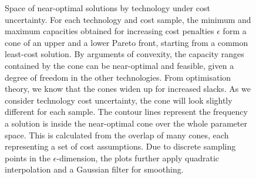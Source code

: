 \begin{figure}
    \vspace{-2cm}
    \noindent{} \noindent{} \noindent{} \caption{ Space of near-optimal solutions by technology under cost
    uncertainty. For each technology and cost sample, the minimum and maximum
    capacities obtained for increasing cost penalties $\epsilon$ form a cone of
    an upper and a lower Pareto front, starting from a common least-cost
    solution. By arguments of convexity, the capacity ranges contained by the
    cone can be near-optimal and feasible, given a degree of freedom in the
    other technologies. From optimisation theory, we know that the cones widen
    up for increased slacks. As we consider technology cost uncertainty, the
    cone will look slightly different for each sample. The contour lines
    represent the frequency a solution is inside the near-optimal cone over the
    whole parameter space. This is calculated from the overlap of many cones,
    each representing a set of cost assumptions. Due to discrete sampling points
    in the $\epsilon$-dimension, the plots further apply quadratic interpolation
    and a Gaussian filter for smoothing. }
    \label{fig:fuzzycone}
\end{figure}

